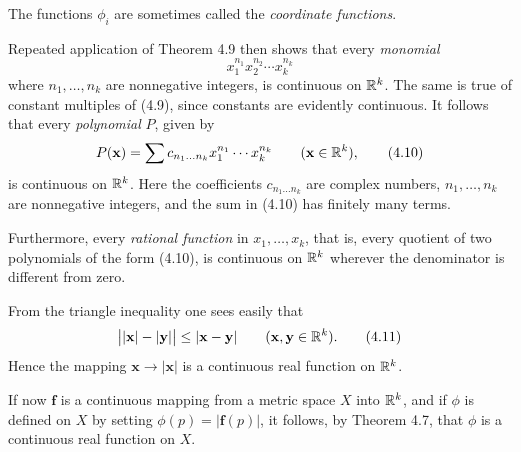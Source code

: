 The functions $\phi_i$ are sometimes called the \emph{coordinate functions}.

Repeated application of Theorem 4.9 then shows that every \emph{monomial}
\begin{equation}
  x_1^{n_1}x_2^{n_2}\cdots x_k^{n_k} \tag{4.9}
\end{equation}
where $n_1,\dots,n_k$ are nonnegative integers, is continuous on $\mathbb{R}^k$. The
same is true of constant multiples of (4.9), since constants are evidently
continuous. It follows that every \emph{polynomial} $P$, given by
\begin{equation}
  P(\mathbf{x}) = \sum c_{n_1\dots n_k}x_1^{n_1}\cdots x_k^{n_k}
  \qquad (\mathbf{x} \in \mathbb{R}^k), \tag{4.10}
\end{equation}
is continuous on $\mathbb{R}^k$. Here the coefficients $c_{n_1\dots n_k}$ are complex
numbers, $n_1,\dots,n_k$ are nonnegative integers, and the sum in (4.10) has
finitely many terms.

Furthermore, every \emph{rational function} in $x_1,\dots,x_k$, that is,
every quotient of two polynomials of the form (4.10), is continuous on $\mathbb{R}^k$
wherever the denominator is different from zero.

From the triangle inequality one sees easily that
\begin{equation}
  \bigl||\mathbf{x}|-|\mathbf{y}|\bigr| \le |\mathbf{x}-\mathbf{y}|
  \qquad (\mathbf{x},\mathbf{y} \in \mathbb{R}^k). \tag{4.11}
\end{equation}
Hence the mapping $\mathbf{x} \to |\mathbf{x}|$ is a continuous real function
on $\mathbb{R}^k$.

If now $\mathbf{f}$ is a continuous mapping from a metric space $X$ into
$\mathbb{R}^k$, and if $\phi$ is defined on $X$ by setting
$\phi(p) = |\mathbf{f}(p)|$, it follows, by Theorem 4.7, that $\phi$ is a
continuous real function on $X$.

